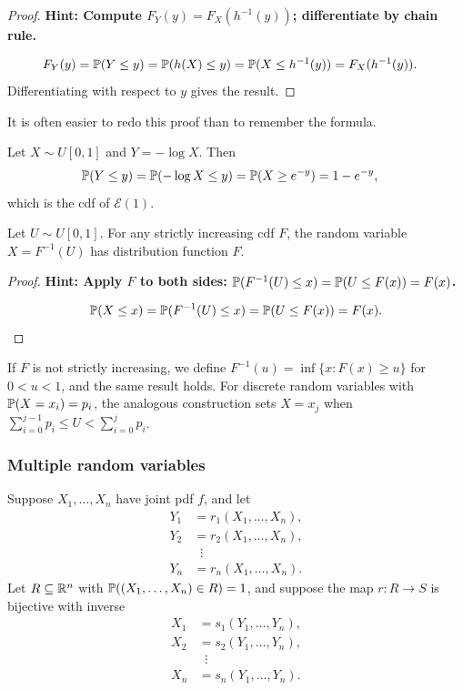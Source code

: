 \documentclass[a4paper]{article}
\begin{document}
\begin{proof}
  \textbf{Hint: Compute $F_Y(y) = F_X(h^{-1}(y))$; differentiate by chain rule.}

  \begin{align*}
    F_Y(y) &= \P(Y \leq y) = \P(h(X) \leq y) = \P(X \leq h^{-1}(y)) = F_X(h^{-1}(y)).
  \end{align*}
  Differentiating with respect to $y$ gives the result.
\end{proof}

\begin{remark}
  It is often easier to redo this proof than to remember the formula.
\end{remark}

\begin{eg}
  Let $X \sim U[0, 1]$ and $Y = -\log X$. Then
  \begin{align*}
    \P(Y \leq y) &= \P(-\log X \leq y) = \P(X \geq e^{-y}) = 1 - e^{-y},
  \end{align*}
  which is the cdf of $\mathcal{E}(1)$.
\end{eg}

\begin{thm}
  Let $U \sim U[0, 1]$.
  For any strictly increasing cdf $F$, the random variable $X = F^{-1}(U)$ has distribution function $F$.
\end{thm}

\begin{proof}
  \textbf{Hint: Apply $F$ to both sides: $\P(F^{-1}(U) \leq x) = \P(U \leq F(x)) = F(x)$.}

  \[
    \P(X \leq x) = \P(F^{-1}(U) \leq x) = \P(U \leq F(x)) = F(x).\qedhere
  \]
\end{proof}

\begin{remark}
  If $F$ is not strictly increasing, we define $F^{-1}(u) = \inf\{x : F(x) \geq u\}$ for $0 < u < 1$, and the same result holds.
  For discrete random variables with $\P(X = x_i) = p_i$, the analogous construction sets $X = x_j$ when $\sum_{i=0}^{j-1} p_i \leq U < \sum_{i=0}^{j} p_i$.
\end{remark}

\subsubsection*{Multiple random variables}
Suppose $X_1, \dotsc, X_n$ have joint pdf $f$, and let
\begin{align*}
  Y_1 &= r_1(X_1, \dotsc, X_n),\\
  Y_2 &= r_2(X_1, \dotsc, X_n),\\
  &\;\;\vdots \\
  Y_n &= r_n(X_1, \dotsc, X_n).
\end{align*}
Let $R \subseteq \R^n$ with $\P((X_1, \dotsc, X_n) \in R) = 1$, and suppose the map $r \colon R \to S$ is bijective with inverse
\begin{align*}
  X_1 &= s_1(Y_1, \dotsc, Y_n),\\
  X_2 &= s_2(Y_1, \dotsc, Y_n),\\
  &\;\;\vdots\\
  X_n &= s_n(Y_1, \dotsc, Y_n).
\end{align*}
\end{document}
